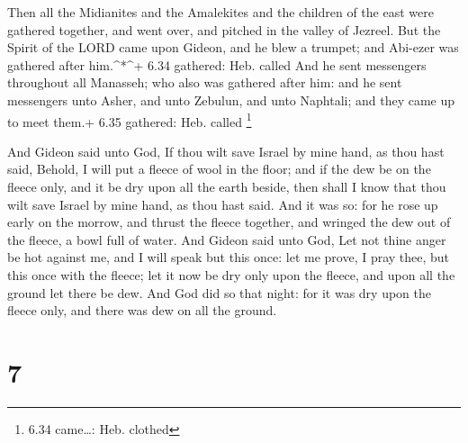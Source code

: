  Then all the Midianites and the Amalekites and the
children of the east were gathered together, and went over, and pitched
in the valley of Jezreel.  But the Spirit of the LORD came
upon Gideon, and he blew a trumpet; and Abi-ezer was gathered after
him.\^{}*\^{}+ 6.34 gathered: Heb. called  And he sent
messengers throughout all Manasseh; who also was gathered after him: and
he sent messengers unto Asher, and unto Zebulun, and unto Naphtali; and
they came up to meet them.+ 6.35 gathered: Heb. called \footnote{6.34
  came\ldots: Heb. clothed}

 And Gideon said unto God, If thou wilt save Israel by mine
hand, as thou hast said,  Behold, I will put a fleece of
wool in the floor; and if the dew be on the fleece only, and it be dry
upon all the earth beside, then shall I know that thou wilt save Israel
by mine hand, as thou hast said.  And it was so: for he
rose up early on the morrow, and thrust the fleece together, and wringed
the dew out of the fleece, a bowl full of water.  And
Gideon said unto God, Let not thine anger be hot against me, and I will
speak but this once: let me prove, I pray thee, but this once with the
fleece; let it now be dry only upon the fleece, and upon all the ground
let there be dew.  And God did so that night: for it was
dry upon the fleece only, and there was dew on all the ground.

\hypertarget{section-6}{%
\section{7}\label{section-6}}


